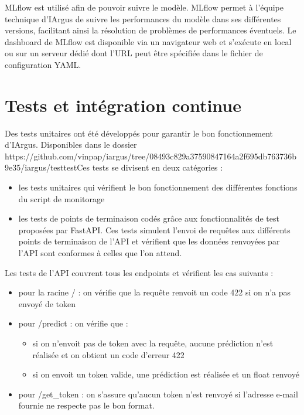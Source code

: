 \documentclass[french]{article}
\begin{document}
    MLflow est utilisé afin de pouvoir suivre le modèle. MLflow permet à l'équipe technique d'IArgus de suivre les performances du modèle dans ses différentes versions, facilitant ainsi la résolution de problèmes de performances éventuels. Le dashboard de MLflow est disponible via un navigateur web et s'exécute en local ou sur un serveur dédié dont l'URL peut être spécifiée dans le fichier de configuration YAML.

    \section{Tests et intégration continue}

    Des tests unitaires ont été développés pour garantir le bon fonctionnement d'IArgus. Disponibles dans le dossier {https://github.com/vinpap/iargus/tree/08493c829a37590847164a2f695db763736b9e35/iargus/test}{test}Ces tests se divisent en deux catégories :
    \begin{itemize}
        \item les tests unitaires qui vérifient le bon fonctionnement des différentes fonctions du script de monitorage
        \item les tests de points de terminaison codés grâce aux fonctionnalités de test proposées par FastAPI. Ces tests simulent l'envoi de requêtes aux différents points de terminaison de l'API et vérifient que les données renvoyées par l'API sont conformes à celles que l'on attend.
    \end{itemize}

    Les tests de l'API couvrent tous les endpoints et vérifient les cas suivants :
    \begin{itemize}
        \item pour la racine / : on vérifie que la requête renvoit un code 422 si on n'a pas envoyé de token
        \item pour /predict : on vérifie que :
        \begin{itemize}
            \item si on n'envoit pas de token avec la requête, aucune prédiction n'est réalisée et on obtient un code d'erreur 422
            \item si on envoit un token valide, une prédiction est réalisée et un float renvoyé
        \end{itemize}
        \item pour /get\_token : on s'assure qu'aucun token n'est renvoyé si l'adresse e-mail fournie ne respecte pas le bon format.
    \end{itemize}
\end{document}

